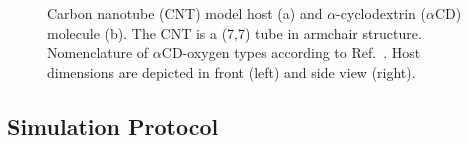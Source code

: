 \documentclass[9pt,lessons,pubversion]{livecoms}
\begin{document}
\begin{figure}[htb!]
  \centering    
  \caption{
  Carbon nanotube (CNT) model host (a) and $\alpha$-cyclodextrin ($\alpha$CD) molecule (b). The CNT is a (7,7) tube in armchair structure.
  Nomenclature of $\alpha$CD-oxygen types according to Ref.~.
  Host dimensions are depicted in front (left) and side view (right).}
  \label{fig:systems}
\end{figure}


\subsection{Simulation Protocol}
\label{sec:theory_setup}
\end{document}
